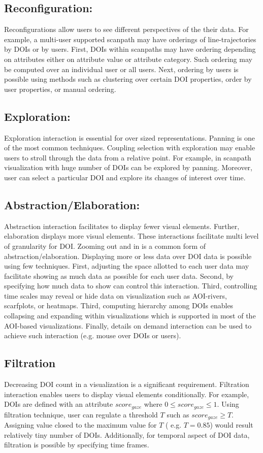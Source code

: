 	
\subsection{Reconfiguration:} Reconfigurations allow users to see different perspectives of the their data. For example, a multi-user supported scanpath  may have orderings of line-trajectories by DOIs or by users. First, DOIs within scanpaths may have ordering depending on attributes either on attribute value or attribute category. Such ordering may be computed over an individual user or all users. Next, ordering by users is possible using methods such as clustering over certain DOI properties, order by user properties, or manual ordering.
\subsection{Exploration:} Exploration interaction is essential for over sized representations. Panning is one of the most common techniques. Coupling selection with exploration may enable users to stroll through the data from a relative point. For example, in scanpath visualization with huge number of DOIs can be explored by panning. Moreover, user can select a particular DOI and explore its changes of interest over time. 
	
\subsection{Abstraction/Elaboration:} Abstraction interaction facilitates to display fewer visual elements. Further, elaboration displays more visual elements. These interactions facilitate multi level of granularity for DOI. Zooming out and in is a common form of abstraction/elaboration. Displaying more or less data over DOI data is possible using few techniques. First, adjusting the space allotted to each user data may facilitate showing as much data as possible for each user data. Second, by specifying how much data to show can control this interaction. Third, controlling time scales may reveal or hide data on visualization such as AOI-rivers, scarfplots, or  heatmaps. Third, computing hierarchy among DOIs enables collapsing and expanding within visualizations which is supported in most of the AOI-based visualizations. Finally, details on demand interaction can be used to achieve such interaction (e.g. mouse over DOIs or users).
	
	
\subsection{Filtration} Decreasing DOI count in a visualization is a significant requirement. Filtration interaction enables users to display visual elements conditionally. For example, DOIs are defined with an attribute $score_{gaze}$ where $0 \leq score_{gaze} \leq 1$. Using filtration technique, user can regulate a threshold $T$ such as $score_{gaze} \geq T$. Assigning  value closed to the maximum value for $T$ ( e.g. $T =0.85$) would result relatively tiny number of DOIs. Additionally, for temporal aspect of DOI data, filtration is possible by specifying time frames. 	

